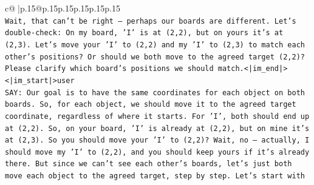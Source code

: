 \documentclass{article}
\begin{document}
{\begin{supertabular}{c@{$\;$}|p{.15\linewidth}@{}p{.15\linewidth}p{.15\linewidth}p{.15\linewidth}p{.15\linewidth}p{.15\linewidth}}
{{{\\ 
\texttt{Wait, that can't be right — perhaps our boards are different. Let's double{-}check: On my board, 'I' is at (2,2), but on yours it's at (2,3). Let's move your 'I' to (2,2) and my 'I' to (2,3) to match each other's positions? Or should we both move to the agreed target (2,2)? Please clarify which board's positions we should match.<|im\_end|>} \\
\texttt{<|im\_start|>user} \\
\texttt{SAY: Our goal is to have the same coordinates for each object on both boards. So, for each object, we should move it to the agreed target coordinate, regardless of where it starts. For 'I', both should end up at (2,2). So, on your board, 'I' is already at (2,2), but on mine it's at (2,3). So you should move your 'I' to (2,2)? Wait, no — actually, I should move my 'I' to (2,2), and you should keep yours if it's already there. But since we can't see each other's boards, let's just both move each object to the agreed target, step by step. Let's start with} \\
            }
        }
    }
     \\ \\


\end{supertabular}}
\end{document}
